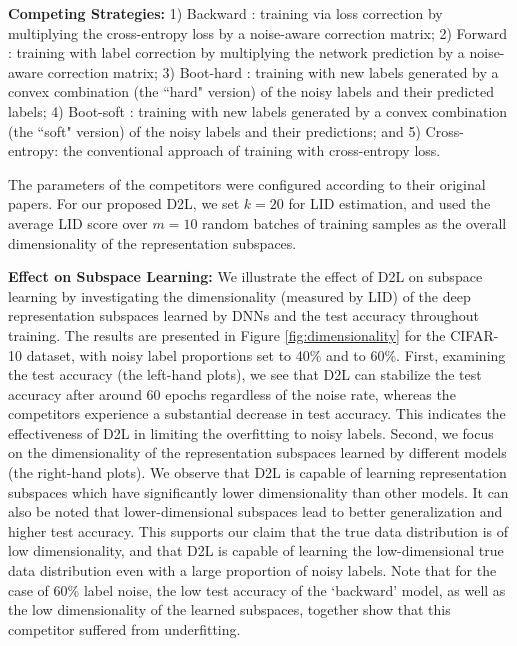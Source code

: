 \documentclass{article}
\begin{document}
\textbf{Competing Strategies:}
1) Backward \cite{patrini2017making}: training via loss correction by multiplying the cross-entropy loss by a noise-aware correction matrix; 2) Forward \cite{patrini2017making}: training with label correction by multiplying the network prediction by a noise-aware correction matrix; 3) Boot-hard \cite{reed2014training}: training with new labels generated by a convex combination (the ``hard" version) of the noisy labels and their predicted labels; 4) Boot-soft \cite{reed2014training}: training with new labels generated by a convex combination (the ``soft" version) of the noisy labels and their predictions; and 5) Cross-entropy: the conventional approach of training with cross-entropy loss.


The parameters of the competitors were configured according to their original papers. For our proposed D2L, we set $k=20$ for LID estimation, and used the average LID score over $m=10$ random batches of training samples as the overall dimensionality of the representation subspaces.



\textbf{Effect on Subspace Learning:}
We illustrate the effect of D2L on subspace learning by investigating the dimensionality (measured by LID) of the deep representation subspaces learned by DNNs and the test accuracy throughout training. The results are presented in Figure \ref{fig:dimensionality} for the CIFAR-10 dataset, with noisy label proportions set to 40\% and to 60\%. First, examining the test accuracy (the left-hand plots), we see that D2L can stabilize the test accuracy after around 60 epochs regardless of the noise rate, whereas the competitors experience a substantial decrease in test accuracy. This indicates the effectiveness of D2L in limiting the overfitting to noisy labels. Second, we focus on the dimensionality of the representation subspaces learned by different models (the right-hand plots). We observe that D2L is capable of learning representation subspaces which have significantly lower dimensionality than other models. It can also be noted that lower-dimensional subspaces lead to better generalization and higher test accuracy. This supports our claim that the true data distribution is of low dimensionality, and that D2L is capable of learning the low-dimensional true data distribution even with a large proportion of noisy labels. Note that for the case of 60\% label noise, the low test accuracy of the `backward' model, as well as the low dimensionality of the learned subspaces, together show that this competitor suffered from underfitting.
\end{document}
